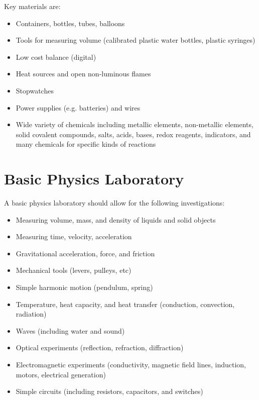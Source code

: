 \begin{itemize}
Key materials are:
\begin{itemize}
\item{Containers, bottles, tubes, balloons}
\item{Tools for measuring volume 
(calibrated plastic water bottles, plastic syringes)}
\item{Low cost balance (digital)}
\item{Heat sources and open non-luminous flames}
\item{Stopwatches}
\item{Power supplies (e.g. batteries) and wires}
\item{Wide variety of chemicals including metallic elements, 
non-metallic elements, solid covalent compounds, salts, 
acids, bases, redox reagents, indicators, 
and many chemicals for specific kinds of reactions}
\end{itemize}

\section{Basic Physics Laboratory}

A basic physics laboratory should allow for the following investigations:
\begin{itemize}
\item{Measuring volume, mass, and density of liquids and solid objects}
\item{Measuring time, velocity, acceleration}
\item{Gravitational acceleration, force, and friction}
\item{Mechanical tools (levers, pulleys, etc)}
\item{Simple harmonic motion (pendulum, spring)}
\item{Temperature, heat capacity, and heat transfer 
(conduction, convection, radiation)}
\item{Waves (including water and sound)}
\item{Optical experiments (reflection, refraction, diffraction)}
\item{Electromagnetic experiments 
(conductivity, magnetic field lines, 
induction, motors, electrical generation)}
\item{Simple circuits (including resistors, capacitors, and switches)}
\end{itemize}


\end{itemize}
